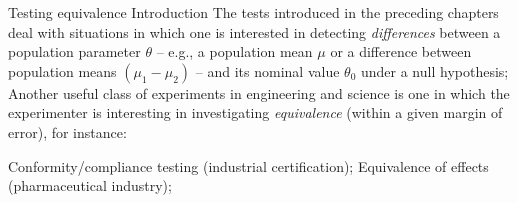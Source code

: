 \documentclass[t]{beamer}
\begin{document}
\begin{frame}[b]
\begin{columns}[T]
\end{columns}
\vhalf
{}
\end{frame}


\begin{ftst}
{Testing equivalence}
{Introduction}
The tests introduced in the preceding chapters deal with situations in which one is interested in detecting \textit{differences} between a population parameter $\theta$ -- e.g., a population mean $\mu$ or a difference between population means $(\mu_1-\mu_2)$ -- and its nominal value $\theta_0$ under a null hypothesis;
\vone
Another useful class of experiments in engineering and science is one in which the experimenter is interesting in investigating \textit{equivalence} (within a given margin of error), for instance:

\bitems Conformity/compliance testing (industrial certification);
\spitem Equivalence of effects (pharmaceutical industry);
\eitem
{}
\end{ftst}
\end{document}
